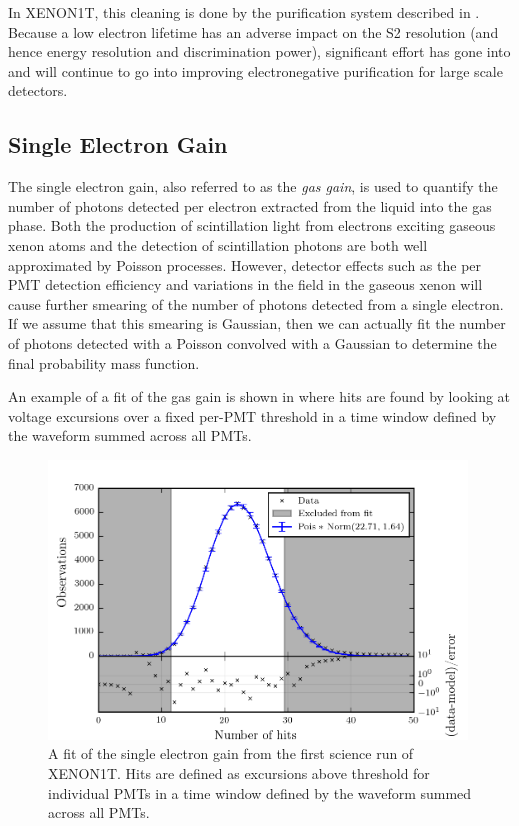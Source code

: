 In XENON1T, this cleaning is done by the purification system described in .  Because a low electron lifetime has an adverse impact on the S2 resolution (and hence energy resolution and discrimination power), significant effort has gone into and will continue to go into improving electronegative purification for large scale detectors.  


\subsection{Single Electron Gain}
\label{sec:xe1t_gas_gain}

The single electron gain, also referred to as the \textit{gas gain}, is used to quantify the number of photons detected per electron extracted from the liquid into the gas phase.  Both the production of scintillation light from electrons exciting gaseous xenon atoms and the detection of scintillation photons are both well approximated by Poisson processes.  However, detector effects such as the per PMT detection efficiency and variations in the field in the gaseous xenon will cause further smearing of the number of photons detected from a single electron.  If we assume that this smearing is Gaussian, then we can actually fit the number of photons detected with a Poisson convolved with a Gaussian to determine the final probability mass function.  

An example of a fit of the gas gain is shown in  where hits are found by looking at voltage excursions over a fixed per-PMT threshold in a time window defined by the waveform summed across all PMTs.

\begin{figure}[t]
	\centering
	\includegraphics[width=0.99\textwidth]{xe1t_single_electron_gain}
	\caption{A fit of the single electron gain from the first science run of XENON1T.  Hits are defined as excursions above threshold for individual PMTs in a time window defined by the waveform summed across all PMTs.}
	\label{fig:xe1t_single_electron_gain}
\end{figure}


